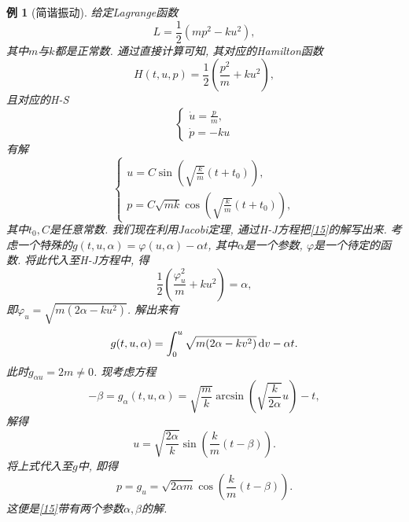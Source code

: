 \documentclass[12pt,a4paper]{article}
\newtheorem{example}[theorem]{例}
\begin{document}
\begin{example}[简谐振动]
    给定Lagrange函数 
    \begin{equation*}
        L= \frac{1}{2}(mp^2 - ku^2),
    \end{equation*}
    其中$m$与$k$都是正常数. 通过直接计算可知, 其对应的Hamilton函数 
    \begin{equation*}
        H(t, u, p) = \frac{1}{2}\left(\frac{p^2}{m} + ku^2\right), 
    \end{equation*}
    且对应的H-S 
    \begin{equation}\label{15}
        \begin{cases} 
            \displaystyle\dot u = \frac{p}{m}, \\  
            \dot p = -ku 
        \end{cases}
    \end{equation}
    有解
    \begin{equation*}
        \begin{cases} 
            \displaystyle u = C\sin\left(\sqrt{\frac{k}{m}}(t + t_0)\right), \\  
            \displaystyle p = C\sqrt{mk}\cos\left(\sqrt{\frac{k}{m}}(t + t_0)\right), 
        \end{cases}
    \end{equation*}
    其中$t_0, C$是任意常数. 我们现在利用Jacobi定理, 通过H-J方程把\eqref{15}的解写出来.
    考虑一个特殊的$g(t, u, \alpha) = \varphi(u, \alpha) - \alpha t$, 其中$\alpha$是一个参数, $\varphi$是一个待定的函数.
    将此代入至H-J方程中, 得
    \begin{equation*}
        \frac{1}{2}\left(\frac{\varphi_u^2}{m} + ku^2\right) = \alpha,
    \end{equation*} 
    即$\varphi_u = \sqrt{m(2\alpha - ku^2)}$. 解出来有 
    \begin{equation*}
        g(t, u, \alpha) = \int_0^u\sqrt{m(2\alpha - kv^2)} \,{\rm d}v - \alpha t.
    \end{equation*}
    此时$g_{\alpha u} = 2m \neq 0$. 现考虑方程 
    \begin{equation*}
        -\beta = g_{\alpha}(t, u, \alpha) = \sqrt{\frac{m}{k}}\arcsin\left(\sqrt{\frac{k}{2\alpha}}u\right) - t,
    \end{equation*}
    解得 
    \begin{equation*}
        u = \sqrt{\frac{2\alpha}{k}}\sin\left(\frac{k}{m}(t - \beta)\right). 
    \end{equation*}
    将上式代入至$g$中, 即得 
    \begin{equation*}
        p = g_u = \sqrt{2\alpha m}\cos\left(\frac{k}{m}(t - \beta)\right).
    \end{equation*}
    这便是\eqref{15}带有两个参数$\alpha, \beta$的解.
\end{example}
\end{document}
